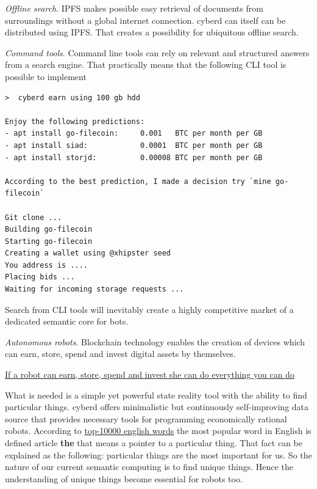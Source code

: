 \documentclass[10pt,oneside]{amsart}
\newcommand{\code}[1]{\textbf{#1}}
\begin{document}
\textit{Offline search}. IPFS makes possible easy retrieval of documents from surroundings without a global internet connection. cyberd can itself can be distributed using IPFS. That creates a possibility for ubiquitous offline search.

\textit{Command tools}. Command line tools can rely on relevant and structured answers from a search engine. That practically means that the following CLI tool is possible to implement

\begin{lstlisting}
>  cyberd earn using 100 gb hdd

Enjoy the following predictions:
- apt install go-filecoin:     0.001   BTC per month per GB
- apt install siad:            0.0001  BTC per month per GB
- apt install storjd:          0.00008 BTC per month per GB

According to the best prediction, I made a decision try `mine go-filecoin`

Git clone ...
Building go-filecoin
Starting go-filecoin
Creating a wallet using @xhipster seed
You address is ....
Placing bids ...
Waiting for incoming storage requests ...

\end{lstlisting}

Search from CLI tools will inevitably create a highly competitive market of a dedicated semantic core for bots.

\textit{Autonomous robots}. Blockchain technology enables the creation of devices which can earn, store, spend and invest digital assets by themselves.

\begin{displayquote}
\underline{If a robot can earn, store, spend and invest she can do everything you can do}
\end{displayquote}

What is needed is a simple yet powerful state reality tool with the ability to find particular things. cyberd offers minimalistic but continuously self-improving data source that provides necessary tools for programming economically rational robots. According to \href{https://github.com/first20hours/google-10000-english}{top-10000 english words} the most popular word in English is defined article \code{the} that means a pointer to a particular thing. That fact can be explained as the following: particular things are the most important for us. So the nature of our current semantic computing is to find unique things. Hence the understanding of unique things become essential for robots too.
\end{document}
